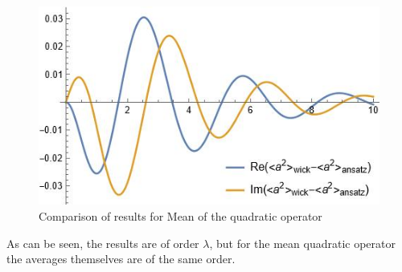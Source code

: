 \documentclass[12pt]{article}
\theoremstyle{definition}
\def\la {\lambda}
\begin{document}
\begin{figure}[h!]
\begin{center}
\begin{minipage}[h!]{0.45\linewidth}
				\includegraphics[width=1\linewidth]{Comparea2.JPG}
				\caption{Comparison of results for Mean of the quadratic operator}
				\label{fig:compa2}
			\end{minipage}
		\end{center}
	\end{figure}

	As can be seen, the results are of order $\la$, but for the mean quadratic operator the averages themselves are of the same order.
	
	
	
	
	
	
		
		
		
		
		
		
		
\end{document}
